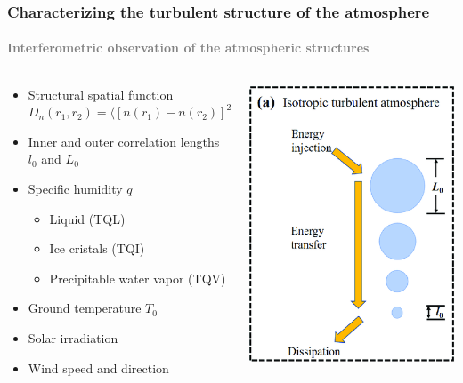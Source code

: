 \documentclass[aspectratio=169]{beamer}
\begin{document}
\begin{frame}
    \frametitle{Characterizing the turbulent structure of the atmosphere}
    \framesubtitle{\textcolor{gray}{Interferometric observation of the atmospheric structures}}
    \begin{columns}
        \begin{column}{0.75\textwidth}
            \begin{itemize}[<+->]
                \item Structural spatial function $D_n(r_1, r_2)=\langle[n(r_1)-n(r_2)]^2\rangle$
                \item Inner and outer correlation lengths $l_0$ and $L_0$
                \item Specific humidity $q$
                    \begin{itemize}
                        \item Liquid (TQL)
                        \item Ice cristals (TQI)
                        \item Precipitable water vapor (TQV)
                    \end{itemize}
                \item Ground temperature $T_0$
                \item Solar irradiation
                \item Wind speed and direction
            \end{itemize}
        \end{column}
        \begin{column}{0.25\textwidth}
            \centering
            \includegraphics[scale=0.4]{Energy.png}

\end{column}
\end{columns}
\end{frame}
\end{document}
